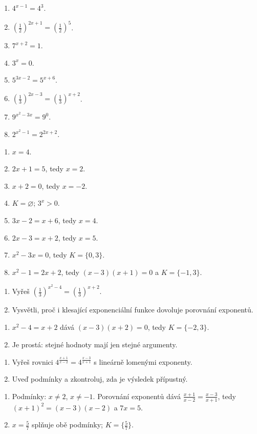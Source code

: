 \documentclass[11pt,a4paper]{article}
\begin{document}
\begin{zadaniReseniBox}[title={Samostatná práce 1}]
\begin{enumerate}[label=\alph*)]
\item $4^{x-1}=4^3$.
\item $\left(\frac{1}{2}\right)^{2x+1}=\left(\frac{1}{2}\right)^5$.
\item $7^{x+2}=1$.
\item $3^x=0$.
\item $5^{3x-2}=5^{x+6}$.
\item $\left(\frac{1}{3}\right)^{2x-3}=\left(\frac{1}{3}\right)^{x+2}$.
\item $9^{x^2-3x}=9^0$.
\item $2^{x^2-1}=2^{2x+2}$.
\end{enumerate}
\tcblower
\begin{enumerate}[label=\alph*)]
\item $x=4$.
\item $2x+1=5$, tedy $x=2$.
\item $x+2=0$, tedy $x=-2$.
\item $K=\varnothing$; $3^x>0$.
\item $3x-2=x+6$, tedy $x=4$.
\item $2x-3=x+2$, tedy $x=5$.
\item $x^2-3x=0$, tedy $K=\{0,3\}$.
\item $x^2-1=2x+2$, tedy $(x-3)(x+1)=0$ a $K=\{-1,3\}$.
\end{enumerate}
\end{zadaniReseniBox}
\begin{zadaniReseniBox}[title={Rozšíření 1}]
\begin{enumerate}[label=\alph*)]
\item Vyřeš $\left(\frac{1}{3}\right)^{x^2-4}=\left(\frac{1}{3}\right)^{x+2}$.
\item Vysvětli, proč i klesající exponenciální funkce dovoluje porovnání exponentů.
\end{enumerate}
\tcblower
\begin{enumerate}[label=\alph*)]
\item $x^2-4=x+2$ dává $(x-3)(x+2)=0$, tedy $K=\{-2,3\}$.
\item Je prostá: stejné hodnoty mají jen stejné argumenty.
\end{enumerate}
\end{zadaniReseniBox}
\begin{zadaniReseniBox}[title={Rozšíření 2}]
\begin{enumerate}[label=\alph*)]
\item Vyřeš rovnici $4^{\frac{x+1}{x-2}}=4^{\frac{x-3}{x+1}}$ s lineárně lomenými exponenty.
\item Uveď podmínky a zkontroluj, zda je výsledek přípustný.
\end{enumerate}
\tcblower
\begin{enumerate}[label=\alph*)]
\item Podmínky: $x\ne2$, $x\ne-1$. Porovnání exponentů dává $\frac{x+1}{x-2}=\frac{x-3}{x+1}$, tedy $(x+1)^2=(x-3)(x-2)$ a $7x=5$.
\item $x=\frac{5}{7}$ splňuje obě podmínky; $K=\{\frac{5}{7}\}$.
\end{enumerate}
\end{zadaniReseniBox}
\end{document}
